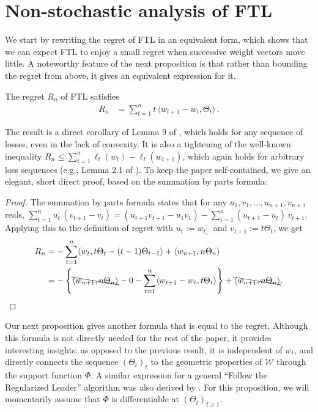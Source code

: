 \documentclass[english]{article}
\newcommand{\cW}{\mathcal{W}}
\newcommand{\ip}[1]{\langle#1\rangle}
\begin{document}
\section{Non-stochastic analysis of FTL}
\label{sec:FTL}
We start by rewriting the regret of FTL in an equivalent form, which shows that we can expect FTL to enjoy a small
regret when successive weight vectors move little. 
A noteworthy feature of the next proposition is that rather than bounding the regret from above, it gives an equivalent
expression for it. 
\begin{proposition}
\label{prop:regretabel}
The regret $R_n$ of FTL satisfies
\begin{align*}
R_n & =  \sum_{t=1}^n t\,\ip{ w_{t+1}-w_t,\Theta_t}  \,.
\end{align*}
\end{proposition}
The result is a direct corollary of Lemma 9 of \citet{McMahan10:Equiv}, which holds 
for any sequence of losses, even in the lack of convexity.
It is also a tightening of the well-known inequality $R_n \le \sum_{t=1}^n \ell_t(w_t)-\ell_t(w_{t+1})$,
which again holds for arbitrary loss sequences (e.g., Lemma 2.1 of \citet{SS12:Book}).
To keep the paper self-contained, we give an elegant, short direct proof, based on the summation by parts formula:
\begin{proof}
The summation by parts formula states that for any $u_1,v_1,\dots,u_{n+1},v_{n+1}$ reals,
$
\sum_{t=1}^n u_t\,(v_{t+1}-v_t) = (u_{t+1}v_{t+1}-u_1 v_1) - \sum_{t=1}^n (u_{t+1}-u_t)\,v_{t+1} 
$.
Applying this to the definition of regret
with $u_t:=w_{t,\cdot}$ and $v_{t+1} := t\Theta_{t}$, we get
\begin{align*}
R_n 
& = -\sum_{t=1}^n \ip{w_t,t\Theta_t - (t-1)\Theta_{t-1}} + \ip{w_{n+1},n\Theta_n}   \\
& = - \left\{ 
		\bcancel{\ip{w_{n+1},n\Theta_n}} - 0 - \sum_{t=1}^n \ip{w_{t+1}-w_t,t\Theta_t}  \right\} +
		\bcancel{\ip{w_{n+1},n\Theta_n}}.
\end{align*}
\end{proof}

Our next proposition gives another formula that is equal to the regret.
Although this formula is not directly needed for the rest of the paper, it provides interesting insights:
as opposed to the previous result, it is independent of $w_t$, and 
directly connects the sequence $(\Theta_t)_t$ to the 
geometric properties of $\cW$ through the support function $\Phi$.
A similar expression for a general ``Follow the Regularized Leader'' algorithm was also derived by \citet{abernethy2014online}.
For this proposition, we will momentarily assume that $\Phi$ is differentiable at $(\Theta_t)_{t\ge 1}$.
\end{document}
